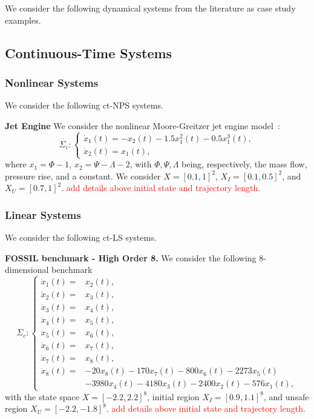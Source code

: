 \documentclass[sigconf]{acmart}
\newcommand{\BW}{\textcolor{red}}
\newcommand{\initial}{X_I}
\newcommand{\unsafe}{X_U}
\begin{document}
We consider the following dynamical systems from the literature as case study examples.

\subsection{Continuous-Time Systems}

\subsubsection{Nonlinear Systems}
We consider the following ct-NPS systems.

\noindent\textbf{Jet Engine}
We consider the nonlinear Moore-Greitzer jet engine model~\cite{krstic1995lean}:
\begin{equation*}
\Sigma_c: \begin{cases}
\dot{x}_1(t) = -x_2(t)-1.5x_1^2(t)-0.5x_1^3(t),\\
\dot{x}_2(t) = x_1(t),
\end{cases}
\end{equation*}
where $x_1=\Phi-1$, $x_2=\Psi - \Lambda -2$, with $\Phi,\Psi,\Lambda$ being, respectively, the mass flow, pressure rise, and a constant. We consider $X = [0.1,1]^2$, $\initial=[0.1,0.5]^2$, and $\unsafe=[0.7,1]^2$. \BW{add details above initial state and trajectory length.}


\subsubsection{Linear Systems}
We consider the following ct-LS systems.

\noindent\textbf{FOSSIL benchmark - High Order 8.}
We consider the following $8$-dimensional benchmark~\cite{abate2021fossil}
\begin{equation*}
\Sigma_c:\begin{cases}
\dot{x}_1(t) = &x_2(t),\\
\dot{x}_2(t) = &x_3(t),\\
\dot{x}_3(t) = &x_4(t),\\
\dot{x}_4(t) = &x_5(t),\\
\dot{x}_5(t) = &x_6(t),\\
\dot{x}_6(t) = &x_7(t),\\
\dot{x}_7(t) = &x_8(t),\\
\dot{x}_8(t) = &-20x_8(t)-170x_7(t)-800x_6(t) - 2273x_5(t)\\ &-3980x_4(t) - 4180x_3(t)  - 2400x_2(t) - 576x_1(t),
\end{cases}
\end{equation*}
with the state space $X=[-2.2,2.2]^8$, initial region $\initial=[0.9,1.1]^8$, and unsafe region $\unsafe=[-2.2,-1.8]^8$. \BW{add details above initial state and trajectory length.}
\end{document}
